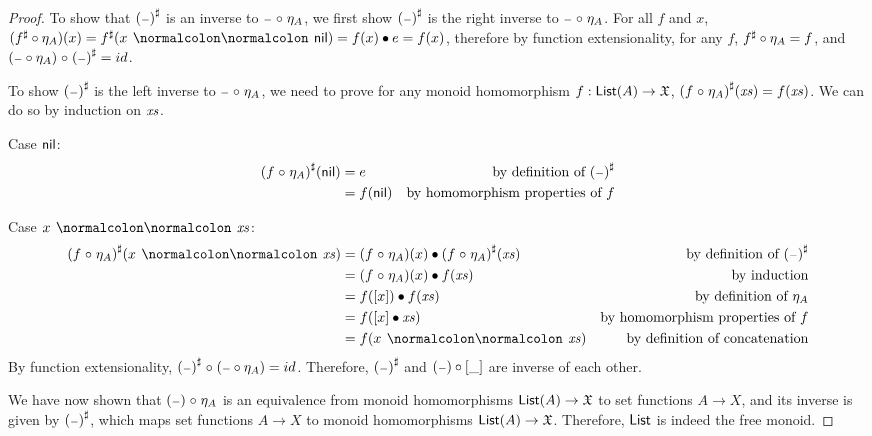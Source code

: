 \begin{proof}
    To show that $\ext{(\blank)}$ is an inverse to $\blank \comp \eta_A$,
    we first show $\ext{(\blank)}$ is the right inverse to $\blank \comp \eta_A$.
    For all $f$ and $x$, $(\ext{f} \circ \eta_A)(x) = \ext{f}(x \cons \nil) = f(x) \mult e = f(x)$,
    therefore by function extensionality, for any $f$, ${f}^{\sharp} \circ \eta_A = f$,
    and $(\blank \circ \eta_A) \comp \ext{(\blank)} = id$.

    To show $\ext{(\blank)}$ is the left inverse to $\blank \comp \eta_A$, we need to prove
    for any monoid homomorphism $f : \operatorname{\mathsf{List}}(A) \to \mathfrak{X}$, ${(f \mathrel{\circ} \eta_A)}^{\sharp}(\mathit{xs}) = f(\mathit{xs})$.
    We can do so by induction on $\mathit{xs}$.

    Case $\operatorname{\mathsf{nil}}$:
    \begin{align*}
        \ext{(f \comp \eta_A)}(\nil)
         & = e       & \text{by definition of $\ext{(\blank)}$} \\
         & = f(\nil) & \text{by homomorphism properties of $f$}
    \end{align*}

    Case $x \cons \xs$:
    \begin{align*}
        \ext{(f \comp \eta_A)}(x \cons \xs)
         & = (f \comp \eta_A)(x) \mult \ext{(f \comp \eta_A)}(\xs) & \text{by definition of $\ext{(\blank)}$} \\
         & = (f \comp \eta_A)(x) \mult f(\xs)                      & \text{by induction}                      \\
         & = f([x]) \mult f(\xs)                                   & \text{by definition of $\eta_A$}         \\
         & = f([x] \mult \xs)                                      & \text{by homomorphism properties of $f$} \\
         & = f(x \cons \xs)                                        & \text{by definition of concatenation}
    \end{align*}
    By function extensionality, $\ext{(\blank)} \comp (\blank \circ \eta_A) = id$.
    Therefore, $\ext{(\blank)}$ and $(\blank) \circ [\_]$ are inverse of each other.

    We have now shown that $(\blank) \comp \eta_A$ is an equivalence from
    monoid homomorphisms $\operatorname{\mathsf{List}}(A) \to \mathfrak{X}$
    to set functions $A \to X$, and its inverse is given by $\ext{(\blank)}$, which maps set
    functions $A \to X$ to monoid homomorphisms $\operatorname{\mathsf{List}}(A) \to \mathfrak{X}$. Therefore, $\operatorname{\mathsf{List}}$ is indeed
    the free monoid.
\end{proof}

